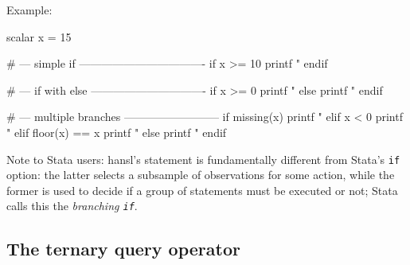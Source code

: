 Example:
\begin{code}
scalar x = 15

# --- simple if ----------------------------------
if x >= 10
   printf "%
endif

# --- if with else -------------------------------
if x >= 0
   printf "%
else
   printf "%
endif

# --- multiple branches --------------------------
if missing(x)
   printf "%
elif x < 0
   printf "%
elif floor(x) == x
   printf "%
else
   printf "%
endif
\end{code}

Note to Stata users: hansl's  statement is fundamentally
different from Stata's \texttt{if} option: the latter selects a
subsample of observations for some action, while the former is used to
decide if a group of statements must be executed or not; Stata calls
this the \emph{branching \texttt{if}}.

\subsection{The ternary query operator}

